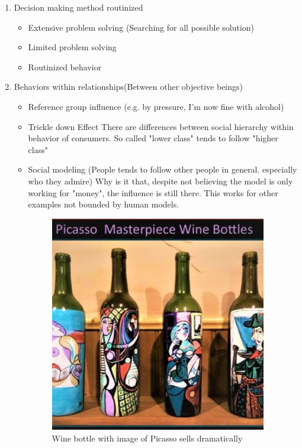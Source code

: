 \documentclass[12pt]{article}
\begin{document}
\begin{enumerate}
	\item Decision making method routinized
	\begin{itemize}
		\item Extensive problem solving (Searching for all possible solution)
		\item Limited problem solving
		\item Routinized behavior
	\end{itemize}
	\item Behaviors within relationships(Between other objective beings)
	\begin{itemize}
		\item Reference group influence (e.g. by pressure, I'm now fine with alcohol)
		\item Trickle down Effect
		There are differences between social hierarchy within behavior of consumers. So called "lower class" tends to follow "higher class"
		\item Social modeling (People tends to follow other people in general. especially who they admire)
		Why is it that, despite not believing the model is only working for "money", the influence is still there. This works for other examples not bounded by human models.
		\begin{figure}[H]
	\centering
	\includegraphics[width=0.95\textwidth]{img/picawine.png}
	\caption{Wine bottle with image of Picasso sells dramatically}
	\label{}
\end{figure}


\end{itemize}
\end{enumerate}
\end{document}
